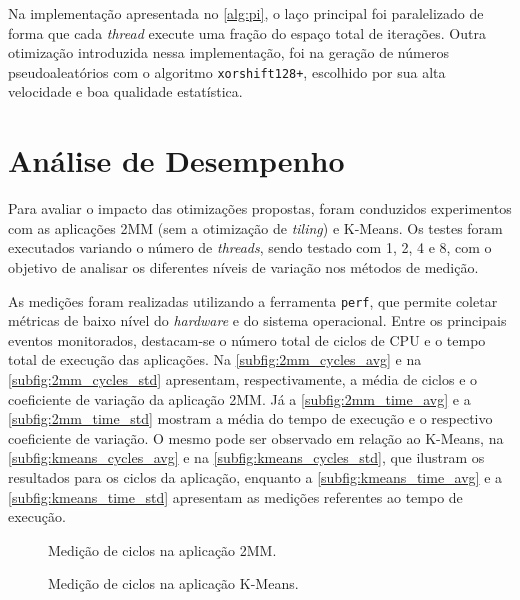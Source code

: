Na implementação apresentada no \autoref{alg:pi}, o laço principal foi paralelizado de forma que cada \textit{thread} execute uma fração do espaço total de iterações. Outra otimização introduzida nessa implementação, foi na geração de números pseudoaleatórios com o algoritmo \texttt{xorshift128+}, escolhido por sua alta velocidade e boa qualidade estatística.

\section{Análise de Desempenho}\label{sec:desempenho}

Para avaliar o impacto das otimizações propostas, foram conduzidos experimentos com as aplicações 2MM (sem a otimização de \textit{tiling}) e K-Means. Os testes foram executados variando o número de \textit{threads}, sendo testado com 1, 2, 4 e 8, com o objetivo de analisar os diferentes níveis de variação nos métodos de medição.

As medições foram realizadas utilizando a ferramenta \texttt{perf}, que permite coletar métricas de baixo nível do \textit{hardware} e do sistema operacional. Entre os principais eventos monitorados, destacam-se o número total de ciclos de CPU e o tempo total de execução das aplicações. Na \autoref{subfig:2mm_cycles_avg} e na \autoref{subfig:2mm_cycles_std} apresentam, respectivamente, a média de ciclos e o coeficiente de variação da aplicação 2MM. Já a \autoref{subfig:2mm_time_avg} e a \autoref{subfig:2mm_time_std} mostram a média do tempo de execução e o respectivo coeficiente de variação. O mesmo pode ser observado em relação ao K-Means, na \autoref{subfig:kmeans_cycles_avg} e na \autoref{subfig:kmeans_cycles_std}, que ilustram os resultados para os ciclos da aplicação, enquanto a \autoref{subfig:kmeans_time_avg} e a \autoref{subfig:kmeans_time_std} apresentam as medições referentes ao tempo de execução.

\begin{figure}[htbp]
	\centering
	\hfill
	\caption{Medição de ciclos na aplicação 2MM.}
	\label{fig:2mm_cycles}
\end{figure}

\begin{figure}[htbp]
	\centering
	\hfill
	\caption{Medição de ciclos na aplicação K-Means.}
	\label{fig:kmeans_cycles}
\end{figure}

